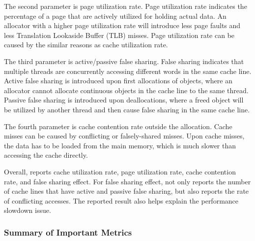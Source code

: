 
The second parameter is page utilization rate. Page utilization rate indicates the percentage of a page that are actively utilized for holding actual data. An allocator with a higher page utilization rate will introduce less page faults and less Translation Lookaside Buffer (TLB) misses. Page utilization rate can be caused by the similar reasons as cache utilization rate.  

The third parameter is active/passive false sharing. False sharing indicates that multiple threads are concurrently accessing different words in the same cache line. Active false sharing is introduced upon first allocations of objects, where an allocator cannot allocate continuous objects in the cache line to the same thread. Passive false sharing is introduced upon deallocations, where a freed object will be utilized by another thread and then cause false sharing in the same cache line. 

The fourth parameter is cache contention rate outside the allocation. Cache misses can be caused by conflicting or falsely-shared misses. Upon cache misses, the data has to be loaded from the main memory, which is much slower than accessing the cache directly. 

Overall, \MP{} reports cache utilization rate, page utilization rate, cache contention rate, and false sharing effect. For false sharing effect, \MP{} not only reports the number of cache lines that have active and passive false sharing, but also reports the rate of conflicting accesses. The reported result also helps explain the performance slowdown issue. 

\subsubsection{Summary of Important Metrics}

